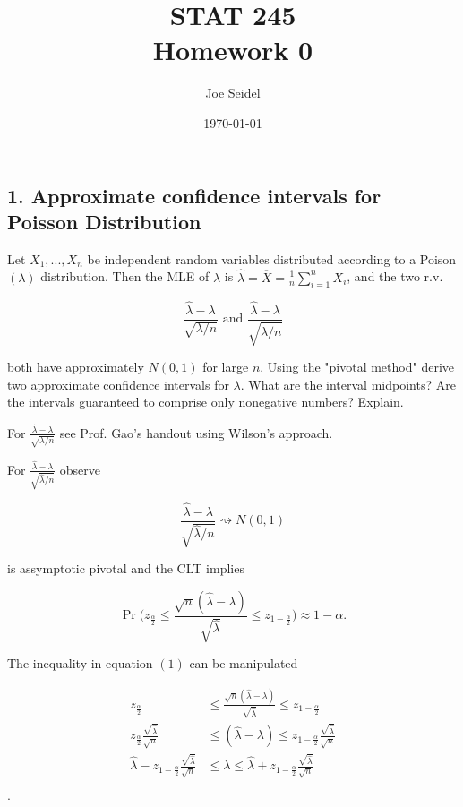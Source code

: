 \documentclass{tufte-book}
\title{STAT  245\\Homework 0}
\author{Joe Seidel}
\date{\today}
\begin{document}
\maketitle
{}
\newpage
{}

\subsection{1. Approximate confidence intervals for Poisson Distribution}
Let $X_1,...,X_n$ be independent random variables distributed according to a Poison$(\lambda)$ distribution.  Then the MLE of $\lambda$ is $\hat{\lambda}=\overline{X}= \frac{1}{n}\sum_{i=1}^nX_i$, and the two r.v.

\[ \frac{\hat{\lambda} - \lambda}{\sqrt{\lambda/n}}\text{ and } \frac{\hat{\lambda} - \lambda}{\sqrt{\hat{\lambda}/n}} \]

both have approximately $N(0,1)$ for large $n$.  Using the "pivotal method" derive two approximate confidence intervals for $\lambda$.  What are the interval midpoints?  Are the intervals guaranteed to comprise only nonegative numbers?  Explain.

For $\frac{\hat{\lambda} - \lambda}{\sqrt{\lambda/n}}$ see Prof. Gao's handout using Wilson's approach.

For $\frac{\hat{\lambda} - \lambda}{\sqrt{\hat{\lambda}/n}}$ observe

\[ \frac{\hat{\lambda} - \lambda}{\sqrt{\hat{\lambda}/n}}  \rightsquigarrow N(0,1) \]

is assymptotic pivotal and the CLT implies

\begin{equation}
\Pr\big( z_{\frac{\alpha}{2}} \leq \frac{\sqrt{n}(\hat{\lambda}-\lambda)}{\sqrt{\hat{\lambda}}} \leq z_{1-\frac{\alpha}{2}} \big) \approx 1-\alpha.
\end{equation}

The inequality in equation $(1)$ can be manipulated

\begin{align*}
z_{\frac{\alpha}{2}} &\leq \frac{\sqrt{n}(\hat{\lambda}-\lambda)}{\sqrt{\hat{\lambda}}} \leq z_{1-\frac{\alpha}{2}}\\
z_{\frac{\alpha}{2}}\frac{\sqrt{\hat{\lambda}}}{\sqrt{n}} &\leq (\hat{\lambda}-\lambda) \leq z_{1-\frac{\alpha}{2}}\frac{\sqrt{\hat{\lambda}}}{\sqrt{n}}\\
\hat{\lambda} - z_{1-\frac{\alpha}{2}}\frac{\sqrt{\hat{\lambda}}}{\sqrt{n}} &\leq \lambda \leq \hat{\lambda} + z_{1-\frac{\alpha}{2}}\frac{\sqrt{\hat{\lambda}}}{\sqrt{n}}\\
\end{align*}.
\end{document}
